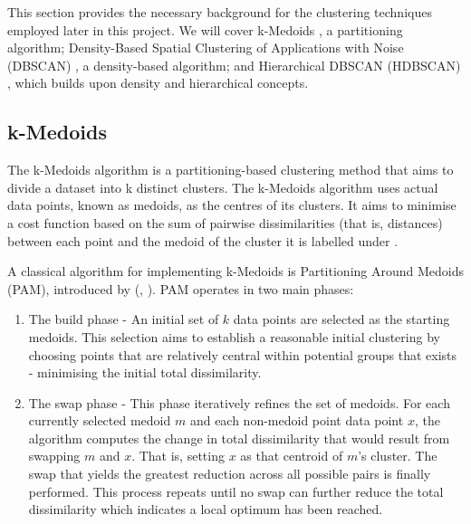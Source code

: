 \documentclass[10pt,oneside]{report}
\renewcommand{\citet}[1]{\citeauthor{#1}, \citeyear{#1}}
\begin{document}
This section provides the necessary background for the clustering techniques employed later in this project. We will cover k-Medoids \cite{kmedoids}, a partitioning algorithm; Density-Based Spatial Clustering of Applications with Noise (DBSCAN) \cite{ester1996density}, a density-based algorithm; and Hierarchical DBSCAN (HDBSCAN) \cite{campello2013density}, which builds upon density and hierarchical concepts.


\subsection{k-Medoids}\label{sec:kmedoids}
The k-Medoids algorithm is a partitioning-based clustering method that aims to divide a dataset into k distinct clusters. The k-Medoids algorithm uses actual data points, known as medoids, as the centres of its clusters. It aims to minimise a cost function based on the sum of pairwise dissimilarities (that is, distances) between each point and the medoid of the cluster it is labelled under \cite{kmedoids}.

A classical algorithm for implementing k-Medoids is Partitioning Around Medoids (PAM), introduced by (\citet{kmedoids}). PAM operates in two main phases:

\begin{enumerate}
    \item The build phase - An initial set of $k$ data points are selected as the starting medoids. This selection aims to establish a reasonable initial clustering by choosing points that are relatively central within potential groups that exists - minimising the initial total dissimilarity.
    \item The swap phase - This phase iteratively refines the set of medoids. For each currently selected medoid $m$ and each non-medoid point data point $x$, the algorithm computes the change in total dissimilarity that would result from swapping $m$ and $x$. That is, setting $x$ as that centroid of $m$'s cluster. The swap that yields the greatest reduction across all possible pairs is finally performed. This process repeats until no swap can further reduce the total dissimilarity which indicates a local optimum has been reached.
\end{enumerate}
\end{document}
